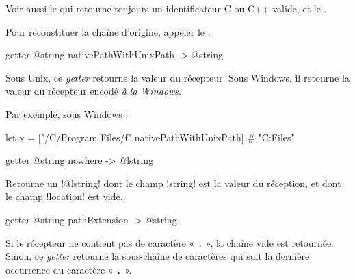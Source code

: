 Voir aussi le  qui retourne toujours un identificateur C ou C++ valide, et le .

Pour reconstituer la chaîne d'origine, appeler le .








\begin{galgas3box}
getter @string nativePathWithUnixPath -> @string
\end{galgas3box}

Sous Unix, ce \emph{getter} retourne la valeur du récepteur. Sous Windows, il retourne la valeur du récepteur encodé \emph{à la Windows}.

Par exemple, sous Windows :
\begin{galgas3}
let x = ["/C/Program Files/f" nativePathWithUnixPath] # "C:\Program Files\f"
\end{galgas3}








\begin{galgas3box}
getter @string nowhere -> @lstring
\end{galgas3box}

Retourne un \ggst!@lstring! dont le champ \ggst!string! est la valeur du réception, et dont le champ \ggst!location! est vide.








\begin{galgas3box}
getter @string pathExtension -> @string
\end{galgas3box}

Si le récepteur ne contient pas de caractère « \texttt{.} », la chaîne vide est retournée. Sinon, ce \emph{getter} retourne la sous-chaîne de caractères qui suit la dernière occurrence du caractère « \texttt{.} ».









